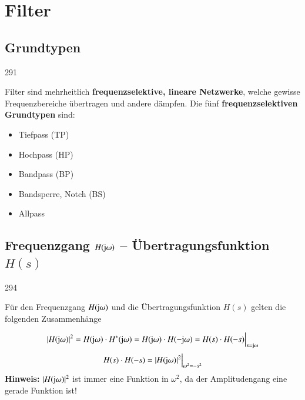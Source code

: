 \section{Filter}


\subsection{Grundtypen}{291}

Filter sind mehrheitlich \textbf{frequenzselektive, lineare Netzwerke}, welche gewisse Frequenzbereiche übertragen
und andere dämpfen. Die fünf \textbf{frequenzselektiven Grundtypen} sind: 

\begin{minipage}[t]{0.25\columnwidth}
    \begin{itemize}
        \item Tiefpass (TP)
        \item Hochpass (HP)
    \end{itemize}
\end{minipage}
\hfill
\begin{minipage}[t]{0.35\columnwidth}
    \begin{itemize}
        \item Bandpass (BP)
        \item Bandsperre, Notch (BS)
    \end{itemize}
\end{minipage}
\hfill
\begin{minipage}[t]{0.25\columnwidth}
    \begin{itemize}
        \item Allpass
    \end{itemize}
\end{minipage}


\subsection{Frequenzgang $H(\mathrm{j} \omega)$ -- Übertragungsfunktion $H(s)$}{294}

Für den Frequenzgang $H(\mathrm{j} \omega)$ und die Übertragungsfunktion $H(s)$ gelten die folgenden Zusammenhänge

$$ | H(\mathrm{j} \omega) |^2 = H(\mathrm{j} \omega) \cdot H^*(\mathrm{j} \omega) = H(\mathrm{j} \omega) \cdot H(- \mathrm{j} \omega) = H(s) \cdot H(-s) \Big|_{s = \mathrm{j} \omega} $$
$$ H(s) \cdot H(-s) = | H(\mathrm{j} \omega) |^2 \Big|_{\omega^2 = -s^2} $$
\textbf{Hinweis:} $| H(\mathrm{j} \omega) |^2$ ist immer eine Funktion in $\omega^2$, da der Amplitudengang eine gerade Funktion ist!

